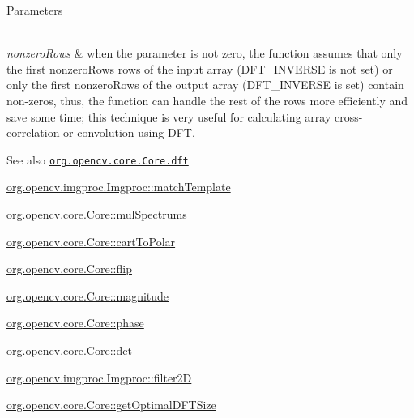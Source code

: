 \begin{DoxyParams}{Parameters}
\begin{DoxyItemize}
\end{DoxyItemize}\\
\hline
{\em nonzero\+Rows} & when the parameter is not zero, the function assumes that only the first {\ttfamily nonzero\+Rows} rows of the input array ({\ttfamily D\+F\+T\+\_\+\+I\+N\+V\+E\+R\+SE} is not set) or only the first {\ttfamily nonzero\+Rows} of the output array ({\ttfamily D\+F\+T\+\_\+\+I\+N\+V\+E\+R\+SE} is set) contain non-\/zeros, thus, the function can handle the rest of the rows more efficiently and save some time; this technique is very useful for calculating array cross-\/correlation or convolution using D\+FT.\\
\hline
\end{DoxyParams}
\begin{DoxySeeAlso}{See also}
\href{http://docs.opencv.org/modules/core/doc/operations_on_arrays.html#dft}{\tt org.\+opencv.\+core.\+Core.\+dft} 

\mbox{\hyperlink{classorg_1_1opencv_1_1imgproc_1_1_imgproc_ab7f64647bb4d0400664056af42b90063}{org.\+opencv.\+imgproc.\+Imgproc\+::match\+Template}} 

\mbox{\hyperlink{classorg_1_1opencv_1_1core_1_1_core_a249146033929c968ef948e290c2a438c}{org.\+opencv.\+core.\+Core\+::mul\+Spectrums}} 

\mbox{\hyperlink{classorg_1_1opencv_1_1core_1_1_core_a395a53b9bd769978c12c2c19a02ffeae}{org.\+opencv.\+core.\+Core\+::cart\+To\+Polar}} 

\mbox{\hyperlink{classorg_1_1opencv_1_1core_1_1_core_a8dc68bbfca84b4fdfb9cd7bd79fc893e}{org.\+opencv.\+core.\+Core\+::flip}} 

\mbox{\hyperlink{classorg_1_1opencv_1_1core_1_1_core_ac0195922fb03d6bad195054e615cb4e1}{org.\+opencv.\+core.\+Core\+::magnitude}} 

\mbox{\hyperlink{classorg_1_1opencv_1_1core_1_1_core_a09f94d89796effb89e2bff15c54b383a}{org.\+opencv.\+core.\+Core\+::phase}} 

\mbox{\hyperlink{classorg_1_1opencv_1_1core_1_1_core_a1f0b3c28295d4db1ecd755201833d6cb}{org.\+opencv.\+core.\+Core\+::dct}} 

\mbox{\hyperlink{classorg_1_1opencv_1_1imgproc_1_1_imgproc_af8d713c4327b7458705f063ad4fa83e5}{org.\+opencv.\+imgproc.\+Imgproc\+::filter2D}} 

\mbox{\hyperlink{classorg_1_1opencv_1_1core_1_1_core_a9818ffe89dca479da8352d5bf6ebd6b3}{org.\+opencv.\+core.\+Core\+::get\+Optimal\+D\+F\+T\+Size}} 
\end{DoxySeeAlso}
\mbox{\label{classorg_1_1opencv_1_1core_1_1_core_a06e879ce4de29934c450c8f1e7631a24}} 
